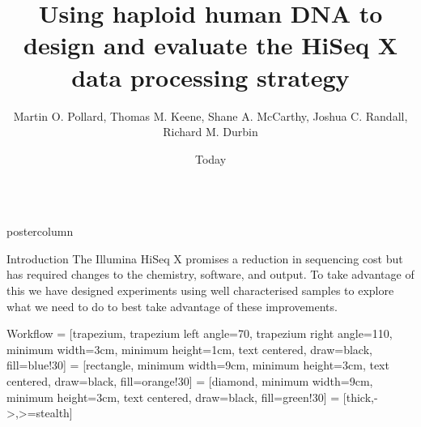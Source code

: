 \documentclass[final]{beamer}
\title{Using haploid human DNA to design and evaluate the HiSeq X data processing strategy}
\author{Martin O. Pollard, Thomas M. Keene, Shane A. McCarthy, Joshua C. Randall, Richard M. Durbin}
\institute[Wellcome Trust Sanger Institute]{Wellcome Trust Sanger Institute}
\date{Today}
\begin{document}
\begin{frame}{}
    \begin{columns}
    \begin{column}{.49\textwidth}
        \begin{beamercolorbox}[center,wd=\textwidth]{postercolumn}
            \begin{minipage}[T]{.95\textwidth}  %
            \begin{block}{Introduction}
            The Illumina HiSeq X promises a reduction in sequencing cost but has required changes to the chemistry, software, and output.  To take advantage of this we have designed experiments using well characterised samples to explore what we need to do to best take advantage of these improvements. 
            \end{block}
            \begin{block}{Workflow}
                 = [trapezium, trapezium left angle=70, trapezium right angle=110, minimum width=3cm, minimum height=1cm, text centered, draw=black, fill=blue!30]
                 = [rectangle, minimum width=9cm, minimum height=3cm, text centered, draw=black, fill=orange!30]
                 = [diamond, minimum width=9cm, minimum height=3cm, text centered, draw=black, fill=green!30]
                 = [thick,->,>=stealth]
                \centering

\end{block}
\end{minipage}
\end{beamercolorbox}
\end{column}
\end{columns}
\end{frame}
\end{document}
